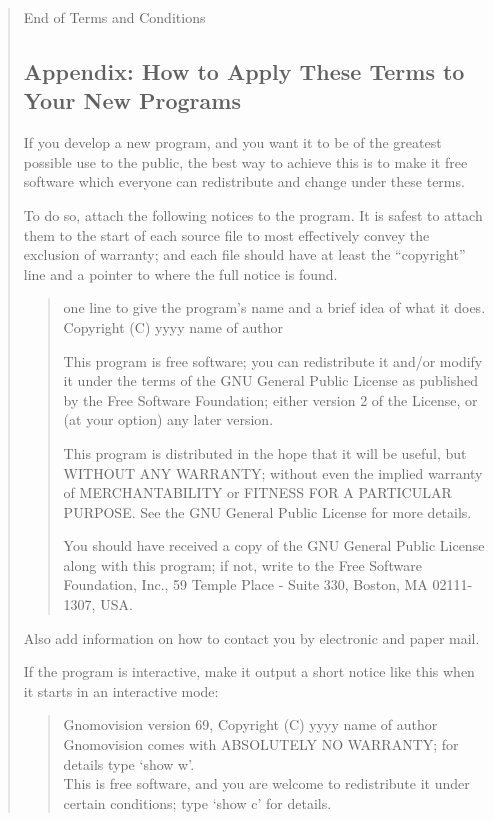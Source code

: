\documentclass[twoside,11pt]{article}
\renewcommand{\_}{\texttt{\symbol{95}}}
\begin{document}
\begin{quote}
\begin{enumerate}
\end{enumerate}


\begin{center}
{\Large\sc End of Terms and Conditions}
\end{center}


\pagebreak[2]

\subsection{Appendix: How to Apply These Terms to Your New Programs}

If you develop a new program, and you want it to be of the greatest
possible use to the public, the best way to achieve this is to make it
free software which everyone can redistribute and change under these
terms.

  To do so, attach the following notices to the program.  It is safest to
  attach them to the start of each source file to most effectively convey
  the exclusion of warranty; and each file should have at least the
  ``copyright'' line and a pointer to where the full notice is found.

\begin{quote}
one line to give the program's name and a brief idea of what it does.
Copyright (C) yyyy  name of author

This program is free software; you can redistribute it and/or modify
it under the terms of the GNU General Public License as published by
the Free Software Foundation; either version 2 of the License, or
(at your option) any later version.

This program is distributed in the hope that it will be useful,
but WITHOUT ANY WARRANTY; without even the implied warranty of
MERCHANTABILITY or FITNESS FOR A PARTICULAR PURPOSE.  See the
GNU General Public License for more details.

You should have received a copy of the GNU General Public License
along with this program; if not, write to the Free Software
Foundation, Inc., 59 Temple Place - Suite 330, Boston, MA  02111-1307, USA.
\end{quote}

Also add information on how to contact you by electronic and paper mail.

If the program is interactive, make it output a short notice like this
when it starts in an interactive mode:

\begin{quote}
Gnomovision version 69, Copyright (C) yyyy  name of author \\
Gnomovision comes with ABSOLUTELY NO WARRANTY; for details type `show w'. \\
This is free software, and you are welcome to redistribute it
under certain conditions; type `show c' for details.
\end{quote}



\end{quote}
\end{document}
